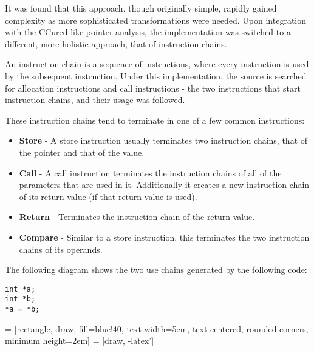 It was found that this approach, though originally simple, rapidly gained complexity as more sophisticated transformations were needed.
Upon integration with the CCured-like pointer analysis, the implementation was switched to a different, more holistic approach, that of instruction-chains.

An instruction chain is a sequence of instructions, where every instruction is used by the subsequent instruction.
Under this implementation, the source is searched for allocation instructions and call instructions - the two instructions that start instruction chains, and their usage was followed.

These instruction chains tend to terminate in one of a few common instructions:

\begin{itemize}
\item \textbf{Store} - A store instruction usually terminates two instruction chains, that of the pointer and that of the value.
\item \textbf{Call} - A call instruction terminates the instruction chains of all of the parameters that are used in it. Additionally it creates a new instruction chain of its return value (if that return value is used).
\item \textbf{Return} - Terminates the instruction chain of the return value.
\item \textbf{Compare} - Similar to a store instruction, this terminates the two instruction chains of its operands.
\end{itemize}

The following diagram shows the two use chains generated by the following code:

\begin{verbatim}
int *a;
int *b;
*a = *b;
\end{verbatim}
 = [rectangle, draw, fill=blue!40, 
    text width=5em, text centered, rounded corners, minimum height=2em]
 = [draw, -latex']

